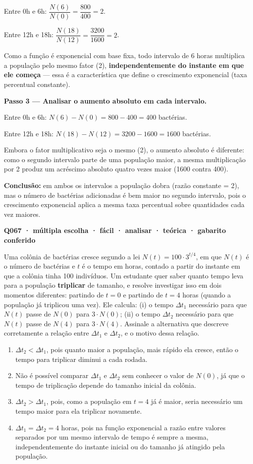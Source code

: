 \documentclass[11pt,a4paper]{article}
\begin{document}
Entre 0h e 6h: $\dfrac{N(6)}{N(0)} = \dfrac{800}{400} = 2$.

Entre 12h e 18h: $\dfrac{N(18)}{N(12)} = \dfrac{3200}{1600} = 2$.

Como a função é exponencial com base fixa, todo intervalo de 6 horas multiplica a população pelo mesmo fator (2), \textbf{independentemente do instante em que ele começa} — essa é a característica que define o crescimento exponencial (taxa percentual constante).

\textbf{Passo 3 — Analisar o aumento absoluto em cada intervalo.}

Entre 0h e 6h: $N(6) - N(0) = 800 - 400 = 400$ bactérias.

Entre 12h e 18h: $N(18) - N(12) = 3200 - 1600 = 1600$ bactérias.

Embora o fator multiplicativo seja o mesmo (2), o aumento absoluto é diferente: como o segundo intervalo parte de uma população maior, a mesma multiplicação por 2 produz um acréscimo absoluto quatro vezes maior (1600 contra 400).

\textbf{Conclusão:} em ambos os intervalos a população dobra (razão constante = 2), mas o número de bactérias adicionadas é bem maior no segundo intervalo, pois o crescimento exponencial aplica a mesma taxa percentual sobre quantidades cada vez maiores.

\bigskip\noindent\textbf{Q067 · múltipla escolha · fácil · analisar · teórica · gabarito conferido}\par\nopagebreak
Uma colônia de bactérias cresce segundo a lei $N(t) = 100 \cdot 3^{t/4}$, em que $N(t)$ é o número de bactérias e $t$ é o tempo em horas, contado a partir do instante em que a colônia tinha 100 indivíduos. Um estudante quer saber quanto tempo leva para a população \textbf{triplicar} de tamanho, e resolve investigar isso em dois momentos diferentes: partindo de $t=0$ e partindo de $t=4$ horas (quando a população já triplicou uma vez). Ele calcula: (i) o tempo $\Delta t_1$ necessário para que $N(t)$ passe de $N(0)$ para $3\cdot N(0)$; (ii) o tempo $\Delta t_2$ necessário para que $N(t)$ passe de $N(4)$ para $3\cdot N(4)$. Assinale a alternativa que descreve corretamente a relação entre $\Delta t_1$ e $\Delta t_2$, e o motivo dessa relação.
\begin{enumerate}[label=(\alph*)]
\item $\Delta t_2 < \Delta t_1$, pois quanto maior a população, mais rápido ela cresce, então o tempo para triplicar diminui a cada rodada.
\item Não é possível comparar $\Delta t_1$ e $\Delta t_2$ sem conhecer o valor de $N(0)$, já que o tempo de triplicação depende do tamanho inicial da colônia.
\item $\Delta t_2 > \Delta t_1$, pois, como a população em $t=4$ já é maior, seria necessário um tempo maior para ela triplicar novamente.
\item $\Delta t_1 = \Delta t_2 = 4$ horas, pois na função exponencial a razão entre valores separados por um mesmo intervalo de tempo é sempre a mesma, independentemente do instante inicial ou do tamanho já atingido pela população.
\end{enumerate}
\end{document}
